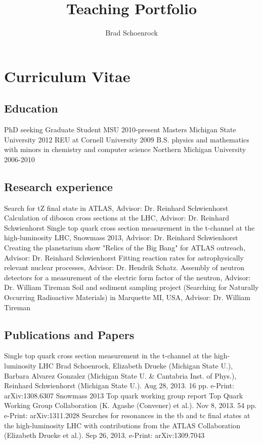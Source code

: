 \documentclass{article}
\title{Teaching Portfolio}
\author{Brad Schoenrock}
\date{}
\begin{document}
\maketitle
\Large
\tableofcontents

\newpage
\section{Curriculum Vitae}
\subsection{Education}
\hspace{0.5cm}PhD seeking Graduate Student MSU 2010-present
Masters Michigan State University 2012
REU at Cornell University 2009
B.S. physics and mathematics with minors in chemistry and computer science Northern Michigan University 2006-2010
\subsection{Research experience}
\hspace{0.5cm}Search for tZ final state in ATLAS, Advisor: Dr. Reinhard Schwienhorst
Calculation of diboson cross sections at the LHC, Advisor: Dr. Reinhard Schwienhorst
Single top quark cross section measurement in the t-channel at the high-luminosity LHC, Snowmass 2013, Advisor: Dr. Reinhard Schwienhorst
Creating the planetarium show "Relics of the Big Bang" for ATLAS outreach, Advisor: Dr. Reinhard Schwienhorst
Fitting reaction rates for astrophysically relevant nuclear processes, Advisor: Dr. Hendrik Schatz. 
Assembly of neutron detectors for a measurement of the electric form factor of the neutron, Advisor: Dr. William Tireman
Soil and sediment sampling project (Searching for Naturally Occurring Radioactive Materials) in Marquette MI, USA, Advisor: Dr. William Tireman
\subsection{Publications and Papers}
\hspace{0.5cm}Single top quark cross section measurement in the t-channel at the high-luminosity LHC
Brad Schoenrock, Elizabeth Drueke (Michigan State U.), Barbara Alvarez Gonzalez (Michigan State U. \& Cantabria Inst. of Phys.), Reinhard Schwienhorst (Michigan State U.). Aug 28, 2013. 16 pp.
e-Print: arXiv:1308.6307
Snowmass 2013 Top quark working group report
Top Quark Working Group Collaboration (K. Agashe (Convener) et al.). Nov 8, 2013. 54 pp.
e-Print: arXiv:1311.2028 
Searches for resonances in the tb and tc final states at the high-luminosity LHC
with contributions from the ATLAS Collaboration (Elizabeth Drueke et al.). Sep 26, 2013.
e-Print: arXiv:1309.7043
\end{document}
